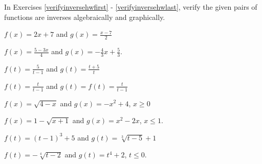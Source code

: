 \documentclass{ximera}
\begin{document}
	\author{Stitz-Zeager}



\label{ExercisesforInverseFunctions}

\begin{question}
In Exercises \ref{verifyinversehwfirst} - \ref{verifyinversehwlast}, verify the given pairs of functions are inverses algebraically and graphically.  




\begin{problem}\label{verifyinversehwfirst}
$f(x) = 2x+7$ and $g(x) = \frac{x-7}{2}$

\end{problem}

\begin{problem}
$f(x) = \frac{5-3x}{4}$ and $g(x) = -\frac{4}{3} x + \frac{5}{3}$.

\end{problem}

\begin{problem}
$f(t) = \frac{5}{t-1}$ and $g(t) = \frac{t+5}{t}$


\end{problem}

\begin{problem}
$f(t)  = \frac{t}{t-1}$ and $g(t) = f(t) =  \frac{t}{t-1}$



\end{problem}

\begin{problem}
$f(x) = \sqrt{4-x}$ and $g(x) = -x^2+4$, $x \geq 0$

\end{problem}

\begin{problem}
$f(x) = 1-\sqrt{x+1}$ and $g(x) = x^2-2x$, $x \leq 1$.

\end{problem}

\begin{problem}
$f(t) = (t-1)^3+5$ and $g(t) = \sqrt[3]{t-5}+1$


\end{problem}

\begin{problem}\label{verifyinversehwlast}
$f(t) = -\sqrt[4]{t-2}$ and $g(t) = t^4+2$, $t \leq 0$.  

\end{problem}
\end{question}
\end{document}
